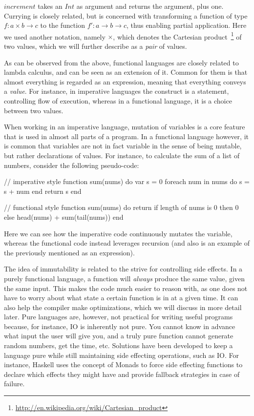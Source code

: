 $increment$ takes an $Int$ as argument and returns the argument, plus one. Currying is closely related, but is concerned with transforming a function of type $f : a \times b \to c$ to the function $f' : a \to b \to c$, thus enabling partial application. Here we used another notation, namely $\times$, which denotes the Cartesian product~\footnote{\url{http://en.wikipedia.org/wiki/Cartesian_product}} of two values, which we will further describe as a \emph{pair} of values.

As can be observed from the above, functional languages are closely related to lambda calculus, and can be seen as an extension of it. Common for them is that almost everything is regarded as an expression, meaning that everything conveys a \emph{value}. For instance, in imperative languages the  construct is a statement, controlling flow of execution, whereas in a functional language, it is a choice between two values.

When working in an imperative language, mutation of variables is a core feature that is used in almost all parts of a program. In a functional language however, it is common that variables are not in fact variable in the sense of being mutable, but rather declarations of values. For instance, to calculate the sum of a list of numbers, consider the following pseudo-code:

\begin{pseudo}

// imperative style
function sum(nums) do
  var s = 0
  foreach num in nums do
    s = s + num
  end
  return s
end

// functional style
function sum(nums) do
  return if length of nums is 0
    then 0
    else head(nums) + sum(tail(nums))
end
\end{pseudo}

Here we can see how the imperative code continuously mutates the  variable, whereas the functional code instead leverages recursion (and also is an example of the previously mentioned  as an expression).

The idea of immutability is related to the strive for controlling side effects. In a purely functional language, a function will \emph{always} produce the same value, given the same input. This makes the code much easier to reason with, as one does not have to worry about what state a certain function is in at a given time. It can also help the compiler make optimizations, which we will discuss in more detail later. Pure languages are, however, not practical for writing useful programs because, for instance, IO is inherently not pure. You cannot know in advance what input the user will give you, and a truly pure function cannot generate random numbers, get the time, etc. Solutions have been developed to keep a language pure while still maintaining side effecting operations, such as IO. For instance, Haskell uses the concept of Monads to force side effecting functions to declare which effects they might have and provide fallback strategies in case of failure.


